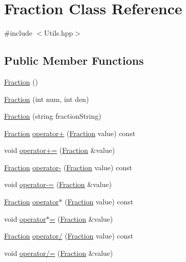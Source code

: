 \hypertarget{class_fraction}{}\section{Fraction Class Reference}
\label{class_fraction}


{\ttfamily \#include $<$Utils.\+hpp$>$}

\subsection*{Public Member Functions}
\begin{DoxyCompactItemize}
\item 
\hyperlink{class_fraction_a29efaf0ef03cceab0bfa637e9eea2b7b}{Fraction} ()
\item 
\hyperlink{class_fraction_a55b666fe7b94b74f21d4919d9110805d}{Fraction} (int num, int den)
\item 
\hyperlink{class_fraction_a679e4834d2576a2b96a2904a81e5d990}{Fraction} (string fraction\+String)
\item 
\hyperlink{class_fraction}{Fraction} \hyperlink{class_fraction_ab72bc0a193460150fed673962f0681b9}{operator+} (\hyperlink{class_fraction}{Fraction} value) const
\item 
void \hyperlink{class_fraction_ad2327333e6f9186984eb728a9243ad1a}{operator+=} (\hyperlink{class_fraction}{Fraction} \&value)
\item 
\hyperlink{class_fraction}{Fraction} \hyperlink{class_fraction_a3ab475288d23337521e46c849bd81a88}{operator-\/} (\hyperlink{class_fraction}{Fraction} value) const
\item 
void \hyperlink{class_fraction_a560957bfe9353cfee0a6d30dbf66fb6f}{operator-\/=} (\hyperlink{class_fraction}{Fraction} \&value)
\item 
\hyperlink{class_fraction}{Fraction} \hyperlink{class_fraction_a88635ae851c5f33fe0c313319303220b}{operator$\ast$} (\hyperlink{class_fraction}{Fraction} value) const
\item 
void \hyperlink{class_fraction_a17225bab7600e54903a4716d21f6186b}{operator$\ast$=} (\hyperlink{class_fraction}{Fraction} \&value)
\item 
\hyperlink{class_fraction}{Fraction} \hyperlink{class_fraction_a60479946006e920343c3e03ce9f4f0f2}{operator/} (\hyperlink{class_fraction}{Fraction} value) const
\item 
void \hyperlink{class_fraction_a4a70499be6c756cf4e0f3982bb2558df}{operator/=} (\hyperlink{class_fraction}{Fraction} \&value)
\item 

\end{DoxyCompactItemize}
